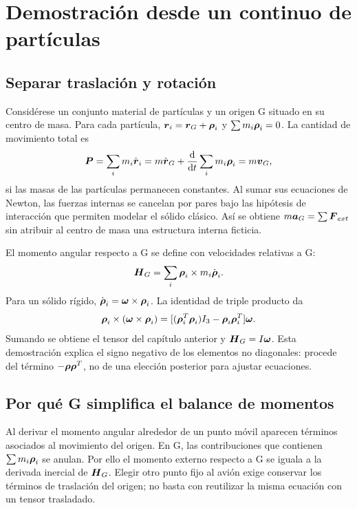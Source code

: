 \section{Demostración desde un continuo de partículas}
\subsection{Separar traslación y rotación}
Considérese un conjunto material de partículas y un origen G situado en su centro de masa. Para cada partícula, $\boldsymbol{r}_i=\boldsymbol{r}_G+\boldsymbol{\rho}_i$ y $\sum m_i\boldsymbol{\rho}_i=0$. La cantidad de movimiento total es
\begin{equation}
\boldsymbol{P}=\sum_i m_i\dot{\boldsymbol{r}}_i
=m\dot{\boldsymbol{r}}_G+\frac{\mathrm{d}}{\mathrm{d} t}\sum_i m_i\boldsymbol{\rho}_i
=m\boldsymbol{v}_G,
\end{equation}
si las masas de las partículas permanecen constantes. Al sumar sus ecuaciones de Newton, las fuerzas internas se cancelan por pares bajo las hipótesis de interacción que permiten modelar el sólido clásico. Así se obtiene $m\boldsymbol{a}_G=\sum\boldsymbol{F}_{ext}$ sin atribuir al centro de masa una estructura interna ficticia.

El momento angular respecto a G se define con velocidades relativas a G:
\begin{equation}
\boldsymbol{H}_G=\sum_i\boldsymbol{\rho}_i\times m_i\dot{\boldsymbol{\rho}}_i.
\end{equation}
Para un sólido rígido, $\dot{\boldsymbol{\rho}}_i=\boldsymbol{\omega}\times\boldsymbol{\rho}_i$. La identidad de triple producto da
\begin{equation}
\boldsymbol{\rho}_i\times(\boldsymbol{\omega}\times\boldsymbol{\rho}_i)
=[(\boldsymbol{\rho}_i^T\boldsymbol{\rho}_i)I_3-\boldsymbol{\rho}_i\boldsymbol{\rho}_i^T]\boldsymbol{\omega}.
\end{equation}
Sumando se obtiene el tensor del capítulo anterior y $\boldsymbol{H}_G=I\boldsymbol{\omega}$. Esta demostración explica el signo negativo de los elementos no diagonales: procede del término $-\boldsymbol{\rho}\boldsymbol{\rho}^T$, no de una elección posterior para ajustar ecuaciones.

\subsection{Por qué G simplifica el balance de momentos}
Al derivar el momento angular alrededor de un punto móvil aparecen términos asociados al movimiento del origen. En G, las contribuciones que contienen $\sum m_i\boldsymbol{\rho}_i$ se anulan. Por ello el momento externo respecto a G se iguala a la derivada inercial de $\boldsymbol{H}_G$. Elegir otro punto fijo al avión exige conservar los términos de traslación del origen; no basta con reutilizar la misma ecuación con un tensor trasladado.

